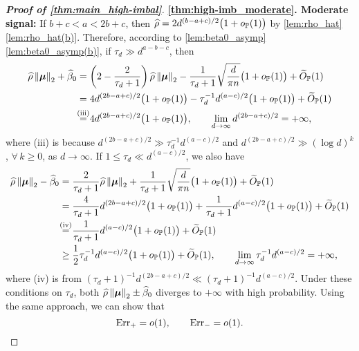 \begin{proof}[\textbf{Proof of \cref{thm:main_high-imbal}}]
\vspace{0.5\baselineskip}
\noindent
\textbf{\ref{thm:high-imb_moderate}. Moderate signal:}
If $b + c < a < 2b + c$, then $\hat\rho = 2d^{(b-a+c)/2}\bigl(1 + o_\P(1)\bigr)$ by \cref{lem:rho_hat}\ref{lem:rho_hat(b)}. Therefore, according to \cref{lem:beta0_asymp}\ref{lem:beta0_asymp(b)}, if $\tau_d \gg d^{a-b-c}$, then
\begin{align*}
        \hat\rho \norm{\vmu}_2 + \hat\beta_0 
        & = \left(2 - \frac{2}{\tau_d + 1}\right) \hat\rho\norm{\vmu}_2 
        - \frac{1}{\tau_d + 1}\sqrt{\frac{d}{\pi n}}\bigl(1 + o_{\P}(1)\bigr) 
        + \wt O_\P(1)  \\
        & = 4 d^{(2b-a+c)/2}  \bigl(1 + o_{\P}(1)\bigr) - \tau_d^{-1} d^{(a-c)/2} \bigl(1 + o_{\P}(1)\bigr) + \wt O_\P(1) \\
        & \overset{\mathmakebox[0pt][c]{\text{(iii)}}}{=} 4 d^{(2b-a+c)/2}  \bigl(1 + o_{\P}(1)\bigr),
        \qquad
    \lim_{d \to \infty} d^{(2b-a+c)/2} = +\infty,
\end{align*}
where (iii) is because $d^{(2b-a+c)/2} \gg \tau_d^{-1} d^{(a-c)/2}$ and $d^{(2b-a+c)/2} \gg (\log d)^k$, $\forall\, k \ge 0$, as $d \to \infty$. If $1 \le \tau_d \ll d^{(a-c)/2}$, we also have
\begin{align*}
        \hat\rho \norm{\vmu}_2 - \hat\beta_0 
        & = \frac{2}{\tau_d + 1} \hat\rho\norm{\vmu}_2 
        + \frac{1}{\tau_d + 1}\sqrt{\frac{d}{\pi n}}\bigl(1 + o_{\P}(1)\bigr) 
        + \wt O_\P(1)  \\
        & = \frac{4}{\tau_d + 1} d^{(2b-a+c)/2} \bigl(1 + o_{\P}(1)\bigr) + \frac{1}{\tau_d + 1} d^{(a-c)/2} \bigl(1 + o_{\P}(1)\bigr) + \wt O_\P(1) \\
        & \overset{\mathmakebox[0pt][c]{\text{(iv)}}}{=} \frac{1}{\tau_d + 1} d^{(a-c)/2} \bigl(1 + o_{\P}(1)\bigr) + \wt O_\P(1) \\
        & \ge \frac12 \tau_d^{-1} d^{(a-c)/2} \bigl(1 + o_{\P}(1)\bigr) + \wt O_\P(1),
        \qquad 
        \lim_{d \to \infty} \tau_d^{-1} d^{(a-c)/2} = +\infty,
\end{align*}
where (iv) is from $(\tau_d + 1)^{-1} d^{(2b-a+c)/2} \ll (\tau_d + 1)^{-1} d^{(a-c)/2}$. Under these conditions on $\tau_d$, both $\hat\rho \norm{\vmu}_2 \pm \hat\beta_0 $ diverges to $+\infty$ with high probability. Using the same approach, we can show that
\begin{equation*}
    \Err_+ = o(1), \qquad \Err_- = o(1).
\end{equation*}


\end{proof}
